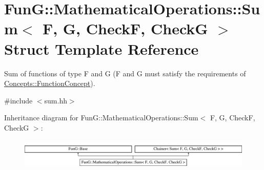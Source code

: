 \hypertarget{structFunG_1_1MathematicalOperations_1_1Sum}{}\section{Fun\+G\+:\+:Mathematical\+Operations\+:\+:Sum$<$ F, G, Check\+F, Check\+G $>$ Struct Template Reference}
\label{structFunG_1_1MathematicalOperations_1_1Sum}


Sum of functions of type F and G (F and G must satisfy the requirements of \hyperlink{structFunG_1_1Concepts_1_1FunctionConcept}{Concepts\+::\+Function\+Concept}).  




{\ttfamily \#include $<$sum.\+hh$>$}

Inheritance diagram for Fun\+G\+:\+:Mathematical\+Operations\+:\+:Sum$<$ F, G, Check\+F, Check\+G $>$\+:\begin{figure}[H]
\begin{center}
\leavevmode
\includegraphics[height=1.473684cm]{structFunG_1_1MathematicalOperations_1_1Sum}
\end{center}
\end{figure}

